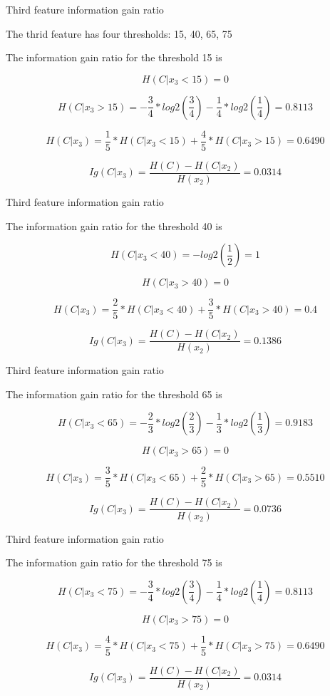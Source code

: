 \begin{frame}{Third feature information gain ratio}
	
	The thrid feature has four thresholds: 15, 40, 65, 75
	
	The information gain ratio for the threshold 15 is
	
	\[ 
		H(C|x_3 < 15) = 0
	\]

	\[ 
		H(C|x_3 > 15) = - \frac{3}{4} * log2\left(\frac{3}{4}\right)
		- \frac{1}{4} * log2\left(\frac{1}{4}\right) = 0.8113
	\]

	\[ 
		H(C|x_3) = \frac{1}{5} * H(C|x_3 < 15) +
		\frac{4}{5} * H(C|x_3 > 15) = 0.6490
	\]

	\[ 
		Ig(C|x_3) = \frac{H(C) - H(C|x_2)}{H(x_2)} = 0.0314
	\]
	
\end{frame}

\begin{frame}{Third feature information gain ratio}
	
	The information gain ratio for the threshold 40 is
	
	\[ 
		H(C|x_3 < 40) = - log2\left(\frac{1}{2}\right) = 1
	\]
	
	\[ 
		H(C|x_3 > 40) = 0
	\]
	
	\[ 
		H(C|x_3) = \frac{2}{5} * H(C|x_3 < 40) +
		\frac{3}{5} * H(C|x_3 > 40) = 0.4
	\]
	
	\[ 
		Ig(C|x_3) = \frac{H(C) - H(C|x_2)}{H(x_2)} = 0.1386
	\]
	
\end{frame}

\begin{frame}{Third feature information gain ratio}
	
	The information gain ratio for the threshold 65 is
	
	\[ 
		H(C|x_3 < 65) = - \frac{2}{3} * log2 \left(\frac{2}{3}\right)
		- \frac{1}{3} * log2 \left(\frac{1}{3}\right) = 0.9183
	\]
	
	\[ 
		H(C|x_3 > 65) = 0
	\]
	
	\[ 
		H(C|x_3) = \frac{3}{5} * H(C|x_3 < 65) +
		\frac{2}{5} * H(C|x_3 > 65) = 0.5510
	\]
	
	\[ 
		Ig(C|x_3) = \frac{H(C) - H(C|x_2)}{H(x_2)} = 0.0736
	\]
	
\end{frame}

\begin{frame}{Third feature information gain ratio}
	
	The information gain ratio for the threshold 75 is
	
	\[ 
		H(C|x_3 < 75) = - \frac{3}{4} * log2 \left(\frac{3}{4}\right)
		- \frac{1}{4} * log2 \left(\frac{1}{4}\right) = 0.8113
	\]
	
	\[ 
		H(C|x_3 > 75) = 0
	\]
	
	\[ 
		H(C|x_3) = \frac{4}{5} * H(C|x_3 < 75) +
		\frac{1}{5} * H(C|x_3 > 75) = 0.6490
	\]
	
	\[ 
		Ig(C|x_3) = \frac{H(C) - H(C|x_2)}{H(x_2)} = 0.0314
	\]
	
\end{frame}

